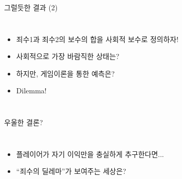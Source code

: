 \documentclass[final]{beamer}
\begin{document}
\begin{frame}[t]{그럴듯한 결과 (2)}
	\begin{columns}[c]
		\column{15em}
		\begin{itemize}
			\item 죄수1과 죄수2의 보수의 합을 사회적 보수로 정의하자! 
			\item 사회적으로 가장 바람직한 상태는? 
			\item 하지만, 게임이론을 통한 예측은? 
			\item Dilemma!
		\end{itemize}
		\column{15em}
		\noindent
		\pause \\[1em]
		\pause \\[1em]
	\end{columns}
\end{frame}

\begin{frame}[t]{우울한 결론?}
	\begin{columns}[c]
		\column{15em}
		\begin{itemize}
			\item 플레이어가 자기 이익만을 충실하게 추구한다면... 
			\item ``죄수의 딜레마''가 보여주는 세상은? 
		\end{itemize}
		\column{12em}
	\end{columns}
\end{frame}
\end{document}
